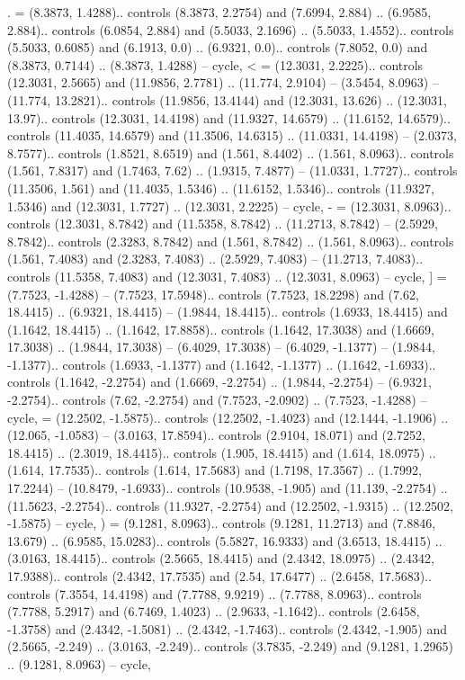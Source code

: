 {.} = {(8.3873, 1.4288).. controls (8.3873, 2.2754) and (7.6994, 2.884) .. (6.9585, 2.884).. controls (6.0854, 2.884) and (5.5033, 2.1696) .. (5.5033, 1.4552).. controls (5.5033, 0.6085) and (6.1913, 0.0) .. (6.9321, 0.0).. controls (7.8052, 0.0) and (8.3873, 0.7144) .. (8.3873, 1.4288) -- cycle},
{<} = {(12.3031, 2.2225).. controls (12.3031, 2.5665) and (11.9856, 2.7781) .. (11.774, 2.9104) -- (3.5454, 8.0963) -- (11.774, 13.2821).. controls (11.9856, 13.4144) and (12.3031, 13.626) .. (12.3031, 13.97).. controls (12.3031, 14.4198) and (11.9327, 14.6579) .. (11.6152, 14.6579).. controls (11.4035, 14.6579) and (11.3506, 14.6315) .. (11.0331, 14.4198) -- (2.0373, 8.7577).. controls (1.8521, 8.6519) and (1.561, 8.4402) .. (1.561, 8.0963).. controls (1.561, 7.8317) and (1.7463, 7.62) .. (1.9315, 7.4877) -- (11.0331, 1.7727).. controls (11.3506, 1.561) and (11.4035, 1.5346) .. (11.6152, 1.5346).. controls (11.9327, 1.5346) and (12.3031, 1.7727) .. (12.3031, 2.2225) -- cycle},
{-} = {(12.3031, 8.0963).. controls (12.3031, 8.7842) and (11.5358, 8.7842) .. (11.2713, 8.7842) -- (2.5929, 8.7842).. controls (2.3283, 8.7842) and (1.561, 8.7842) .. (1.561, 8.0963).. controls (1.561, 7.4083) and (2.3283, 7.4083) .. (2.5929, 7.4083) -- (11.2713, 7.4083).. controls (11.5358, 7.4083) and (12.3031, 7.4083) .. (12.3031, 8.0963) -- cycle},
{]} = {(7.7523, -1.4288) -- (7.7523, 17.5948).. controls (7.7523, 18.2298) and (7.62, 18.4415) .. (6.9321, 18.4415) -- (1.9844, 18.4415).. controls (1.6933, 18.4415) and (1.1642, 18.4415) .. (1.1642, 17.8858).. controls (1.1642, 17.3038) and (1.6669, 17.3038) .. (1.9844, 17.3038) -- (6.4029, 17.3038) -- (6.4029, -1.1377) -- (1.9844, -1.1377).. controls (1.6933, -1.1377) and (1.1642, -1.1377) .. (1.1642, -1.6933).. controls (1.1642, -2.2754) and (1.6669, -2.2754) .. (1.9844, -2.2754) -- (6.9321, -2.2754).. controls (7.62, -2.2754) and (7.7523, -2.0902) .. (7.7523, -1.4288) -- cycle},
{\ctpbackslash} = {(12.2502, -1.5875).. controls (12.2502, -1.4023) and (12.1444, -1.1906) .. (12.065, -1.0583) -- (3.0163, 17.8594).. controls (2.9104, 18.071) and (2.7252, 18.4415) .. (2.3019, 18.4415).. controls (1.905, 18.4415) and (1.614, 18.0975) .. (1.614, 17.7535).. controls (1.614, 17.5683) and (1.7198, 17.3567) .. (1.7992, 17.2244) -- (10.8479, -1.6933).. controls (10.9538, -1.905) and (11.139, -2.2754) .. (11.5623, -2.2754).. controls (11.9327, -2.2754) and (12.2502, -1.9315) .. (12.2502, -1.5875) -- cycle},
{)} = {(9.1281, 8.0963).. controls (9.1281, 11.2713) and (7.8846, 13.679) .. (6.9585, 15.0283).. controls (5.5827, 16.9333) and (3.6513, 18.4415) .. (3.0163, 18.4415).. controls (2.5665, 18.4415) and (2.4342, 18.0975) .. (2.4342, 17.9388).. controls (2.4342, 17.7535) and (2.54, 17.6477) .. (2.6458, 17.5683).. controls (7.3554, 14.4198) and (7.7788, 9.9219) .. (7.7788, 8.0963).. controls (7.7788, 5.2917) and (6.7469, 1.4023) .. (2.9633, -1.1642).. controls (2.6458, -1.3758) and (2.4342, -1.5081) .. (2.4342, -1.7463).. controls (2.4342, -1.905) and (2.5665, -2.249) .. (3.0163, -2.249).. controls (3.7835, -2.249) and (9.1281, 1.2965) .. (9.1281, 8.0963) -- cycle},

